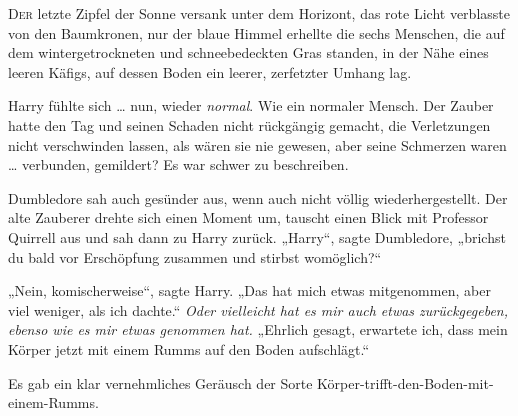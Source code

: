 
\lettrine{D}{er} letzte Zipfel der Sonne versank unter dem Horizont, das rote Licht verblasste von den Baumkronen, nur der blaue Himmel erhellte die sechs Menschen, die auf dem wintergetrockneten und schneebedeckten Gras standen, in der Nähe eines leeren Käfigs, auf dessen Boden ein leerer, zerfetzter Umhang lag.

Harry fühlte sich … nun, wieder \emph{normal}. Wie ein normaler Mensch. Der Zauber hatte den Tag und seinen Schaden nicht rückgängig gemacht, die Verletzungen nicht verschwinden lassen, als wären sie nie gewesen, aber seine Schmerzen waren … verbunden, gemildert? Es war schwer zu beschreiben.

Dumbledore sah auch gesünder aus, wenn auch nicht völlig wiederhergestellt. Der alte Zauberer drehte sich einen Moment um, tauscht einen Blick mit Professor Quirrell aus und sah dann zu Harry zurück.
„Harry“, sagte Dumbledore, „brichst du bald vor Erschöpfung zusammen und stirbst womöglich?“

„Nein, komischerweise“, sagte Harry.
„Das hat mich etwas mitgenommen, aber viel weniger, als ich dachte.“ \emph{Oder vielleicht hat es mir auch etwas zurückgegeben, ebenso wie es mir etwas genommen hat.}
„Ehrlich gesagt, erwartete ich, dass mein Körper jetzt mit einem Rumms auf den Boden aufschlägt.“

Es gab ein klar vernehmliches Geräusch der Sorte Körper-trifft-den-Boden-mit-einem-Rumms.

